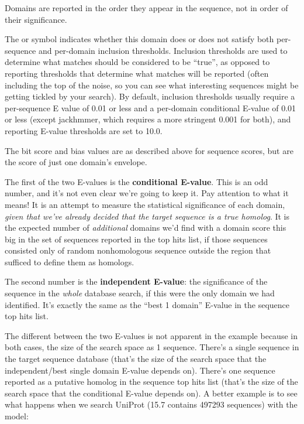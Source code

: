 Domains are reported in the order they appear in the sequence, not in
order of their significance.

The \ccode{!} or  symbol indicates whether this domain does
or does not satisfy both per-sequence and per-domain inclusion
thresholds. Inclusion thresholds are used to determine what matches
should be considered to be ``true'', as opposed to reporting
thresholds that determine what matches will be reported (often
including the top of the noise, so you can see what interesting
sequences might be getting tickled by your search). By default,
inclusion thresholds usually require a per-sequence E value of 0.01 or
less and a per-domain conditional E-value of 0.01 or less (except
jackhmmer, which requires a more stringent 0.001 for both), and
reporting E-value thresholds are set to 10.0.

The bit score and bias values are as described above for sequence
scores, but are the score of just one domain's envelope. 

The first of the two E-values is the \textbf{conditional
E-value}. This is an odd number, and it's not even clear we're going
to keep it. Pay attention to what it means! It is an attempt to
measure the statistical significance of each domain, \emph{given that
we've already decided that the target sequence is a true homolog}.  It
is the expected number of \emph{additional} domains we'd find with a
domain score this big in the set of sequences reported in the top hits
list, if those sequences consisted only of random nonhomologous
sequence outside the region that sufficed to define them as homologs. 

The second number is the \textbf{independent E-value}: the
significance of the sequence in the \emph{whole} database search, if
this were the only domain we had identified. It's exactly the same as
the ``best 1 domain'' E-value in the sequence top hits list.

The different between the two E-values is not apparent in the
 example because in both cases, the size of the
search space as 1 sequence. There's a single sequence in the target
sequence database (that's the size of the search space that the
independent/best single domain E-value depends on). There's one
sequence reported as a putative homolog in the sequence top hits list
(that's the size of the search space that the conditional E-value
depends on). A better example is to see what happens when we search
UniProt (15.7 contains 497293 sequences) with the  model:


